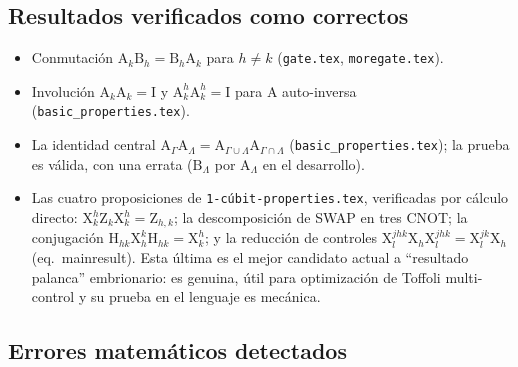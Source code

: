 \documentclass[12pt, a4paper]{article}
\newcommand{\gate}[1]{\text{#1}}
\newcommand{\stategate}[3]{\gate{#1}^{#2}_{#3}}
\begin{document}
\subsection{Resultados verificados como correctos}

\begin{itemize}
  \item Conmutación $\gate{A}_k\gate{B}_h = \gate{B}_h\gate{A}_k$ para
        $h \neq k$ (\texttt{gate.tex}, \texttt{moregate.tex}).
  \item Involución $\gate{A}_k\gate{A}_k=\gate{I}$ y
        $\stategate{A}{h}{k}\stategate{A}{h}{k}=\gate{I}$ para $\gate{A}$
        auto-inversa (\texttt{basic\_properties.tex}).
  \item La identidad central
        $\gate{A}_\Gamma\gate{A}_\Lambda =
          \gate{A}_{\Gamma\cup\Lambda}\gate{A}_{\Gamma\cap\Lambda}$
        (\texttt{basic\_properties.tex}); la prueba es válida, con una errata
        ($\gate{B}_\Lambda$ por $\gate{A}_\Lambda$ en el desarrollo).
  \item Las cuatro proposiciones de \texttt{1-cúbit-properties.tex},
        verificadas por cálculo directo:
        $\stategate{X}{h}{k}\gate{Z}_k\stategate{X}{h}{k}=\gate{Z}_{h,k}$;
        la descomposición de SWAP en tres CNOT; la conjugación
        $\gate{H}_{hk}\stategate{X}{k}{h}\gate{H}_{hk}=\stategate{X}{h}{k}$;
        y la reducción de controles
        $\stategate{X}{jhk}{l}\gate{X}_h\stategate{X}{jhk}{l}
          =\stategate{X}{jk}{l}\gate{X}_h$ (eq.~mainresult). Esta última es el
        mejor candidato actual a ``resultado palanca'' embrionario: es
        genuina, útil para optimización de Toffoli multi-control y su prueba
        en el lenguaje es mecánica.
\end{itemize}

\subsection{Errores matemáticos detectados}
\end{document}
